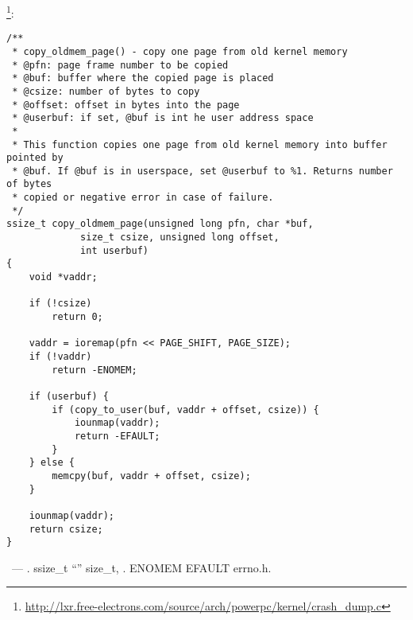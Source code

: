 \footnote{\url{http://lxr.free-electrons.com/source/arch/powerpc/kernel/crash_dump.c}}:

\begin{lstlisting}[caption=arch/arm/kernel/crash\_dump.c]
/**
 * copy_oldmem_page() - copy one page from old kernel memory
 * @pfn: page frame number to be copied
 * @buf: buffer where the copied page is placed
 * @csize: number of bytes to copy
 * @offset: offset in bytes into the page
 * @userbuf: if set, @buf is int he user address space
 *
 * This function copies one page from old kernel memory into buffer pointed by
 * @buf. If @buf is in userspace, set @userbuf to %1. Returns number of bytes
 * copied or negative error in case of failure.
 */
ssize_t copy_oldmem_page(unsigned long pfn, char *buf,
			 size_t csize, unsigned long offset,
			 int userbuf)
{
	void *vaddr;

	if (!csize)
		return 0;

	vaddr = ioremap(pfn << PAGE_SHIFT, PAGE_SIZE);
	if (!vaddr)
		return -ENOMEM;

	if (userbuf) {
		if (copy_to_user(buf, vaddr + offset, csize)) {
			iounmap(vaddr);
			return -EFAULT;
		}
	} else {
		memcpy(buf, vaddr + offset, csize);
	}

	iounmap(vaddr);
	return csize;
}
\end{lstlisting}

 ~--- 
. 
 ssize\_t  ``'' size\_t,
.
ENOMEM \AndENRU EFAULT  errno.h.

